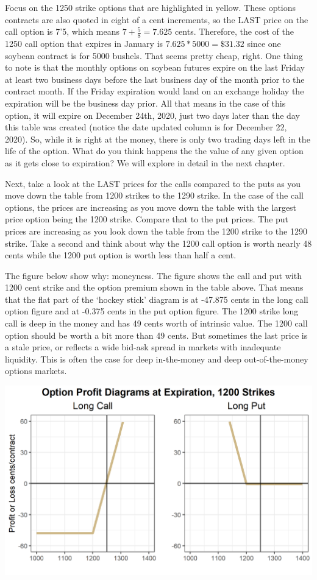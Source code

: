 \documentclass[
]{book}
\begin{document}
Focus on the 1250 strike options that are highlighted in yellow. These options contracts are also quoted in eight of a cent increments, so the LAST price on the call option is 7'5, which means \(7 + \frac{5}{8} = 7.625\) cents. Therefore, the cost of the 1250 call option that expires in January is \(7.625*5000 = \$31.32\) since one soybean contract is for 5000 bushels. That seems pretty cheap, right. One thing to note is that the monthly options on soybean futures expire on the last Friday at least two business days before the last business day of the month prior to the contract month. If the Friday expiration would land on an exchange holiday the expiration will be the business day prior. All that means in the case of this option, it will expire on December 24th, 2020, just two days later than the day this table was created (notice the date updated column is for December 22, 2020). So, while it is right at the money, there is only two trading days left in the life of the option. What do you think happens the the value of any given option as it gets close to expiration? We will explore in detail in the next chapter.

Next, take a look at the LAST prices for the calls compared to the puts as you move down the table from 1200 strikes to the 1290 strike. In the case of the call options, the prices are increasing as you move down the table with the largest price option being the 1200 strike. Compare that to the put prices. The put prices are increasing as you look down the table from the 1200 strike to the 1290 strike. Take a second and think about why the 1200 call option is worth nearly 48 cents while the 1200 put option is worth less than half a cent.

The figure below show why: moneyness. The figure shows the call and put with 1200 cent strike and the option premium shown in the table above. That means that the flat part of the `hockey stick' diagram is at -47.875 cents in the long call option figure and at -0.375 cents in the put option figure. The 1200 strike long call is deep in the money and has 49 cents worth of intrinsic value. The 1200 call option should be worth a bit more than 49 cents. But sometimes the last price is a stale price, or reflects a wide bid-ask spread in markets with inadequate liquidity. This is often the case for deep in-the-money and deep out-of-the-money options markets.

\includegraphics{assets/Options1-optionmoneynessplot.png}
\end{document}
